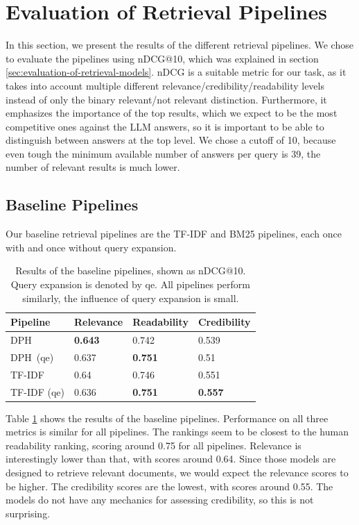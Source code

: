 \section{Evaluation of Retrieval Pipelines}
In this section, we present the results of the different retrieval pipelines.
We chose to evaluate the pipelines using nDCG@10, which was explained in section \ref{sec:evaluation-of-retrieval-models}.
nDCG is a suitable metric for our task, as it takes into account multiple different relevance/credibility/readability levels instead of only the binary relevant/not relevant distinction.
Furthermore, it emphasizes the importance of the top results, which we expect to be the most competitive ones against the LLM answers, so it is important to be able to distinguish between answers at the top level.
We chose a cutoff of 10, because even tough the minimum available number of answers per query is 39, the number of relevant results is much lower.

\subsection{Baseline Pipelines}
Our baseline retrieval pipelines are the TF-IDF and BM25 pipelines, each once with and once without query expansion.
\begin{table}[tb]
\centering
\begin{tabularx}{\textwidth}{lXXX}
\hline
Pipeline    & Relevance          & Readability        & Credibility        \\ \hline
DPH         & \textbf{0.643} & 0.742 & 0.539 \\
DPH\ (qe)     & 0.637 & \textbf{0.751} & 0.51  \\
TF-IDF     & 0.64  & 0.746 & 0.551 \\
TF-IDF (qe) & 0.636 & \textbf{0.751} & \textbf{0.557} \\
\hline
\end{tabularx}
\caption{Results of the baseline pipelines, shown as nDCG@10. Query expansion is denoted by qe.
All pipelines perform similarly, the influence of query expansion is small.}
\label{tab:baseline_pipelines}
\end{table}
Table \ref{tab:baseline_pipelines} shows the results of the baseline pipelines.
Performance on all three metrics is similar for all pipelines.
The rankings seem to be closest to the human readability ranking, scoring around 0.75 for all pipelines.
Relevance is interestingly lower than that, with scores around 0.64.
Since those models are designed to retrieve relevant documents, we would expect the relevance scores to be higher.
The credibility scores are the lowest, with scores around 0.55.
The models do not have any mechanics for assessing credibility, so this is not surprising.

